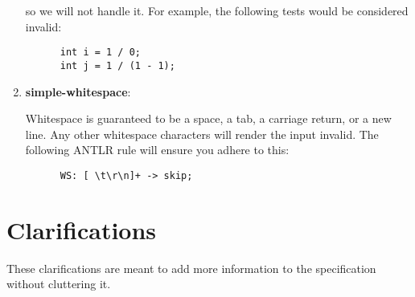 \documentclass{article}
\newcommand{\assertiondest}[1]{\hypertarget{#1}{\textbf{#1}:}}
\begin{document}
\begin{enumerate}
    so we will not handle it. For example, the following tests would be considered invalid:
    \begin{lstlisting}
      int i = 1 / 0;
      int j = 1 / (1 - 1);
    \end{lstlisting}
  \item
    \assertiondest{simple-whitespace}
    Whitespace is guaranteed to be a space, a tab, a carriage return, or a new
    line. Any other whitespace characters will render the input invalid. The following ANTLR rule
    will ensure you adhere to this:
    \begin{lstlisting}
      WS: [ \t\r\n]+ -> skip;
    \end{lstlisting}
\end{enumerate}

\section{Clarifications}
These clarifications are meant to add more information to the specification without cluttering it.
\end{document}

